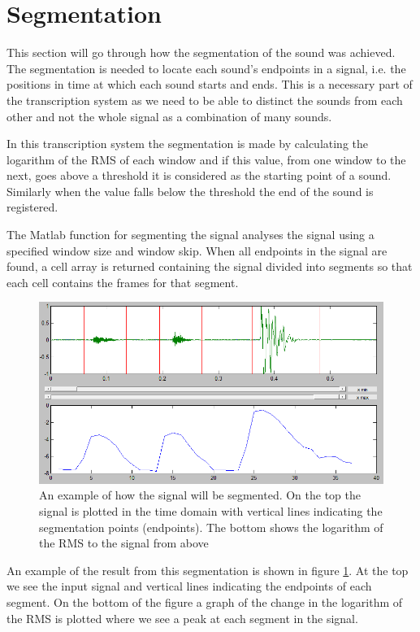 \section{Segmentation}
This section will go through how the segmentation of the sound was achieved. The segmentation is needed to locate each sound's endpoints in a signal, i.e. the positions in time at which each sound starts and ends. This is a necessary part of the transcription system as we need to be able to distinct the sounds from each other and not the whole signal as a combination of many sounds.

In this transcription system the segmentation is made by calculating the logarithm of the RMS of each window and if this value, from one window to the next, goes above a threshold it is considered as the starting point of a sound. Similarly when the value falls below the threshold the end of the sound is registered.

The Matlab function for segmenting the signal analyses the signal using a specified window size and window skip. When all endpoints in the signal are found, a cell array is returned containing the signal divided into segments so that each cell contains the frames for that segment.

\begin{figure}[h]
	\begin{center}
		\includegraphics[scale =  0.4]{fig/SegmentationPic.png}
		\caption{An example of how the signal will be segmented. On the top the signal is plotted in the time domain with vertical lines indicating the segmentation points (endpoints). The bottom shows the logarithm of the RMS to the signal from above}
		\label{SegmentationPic}
	\end{center}
\end{figure}

An example of the result from this segmentation is shown in figure \ref{SegmentationPic}. At the top we see the input signal and vertical lines indicating the endpoints of each segment. On the bottom of the figure a graph of the change in the logarithm of the RMS is plotted where we see a peak at each segment in the signal.